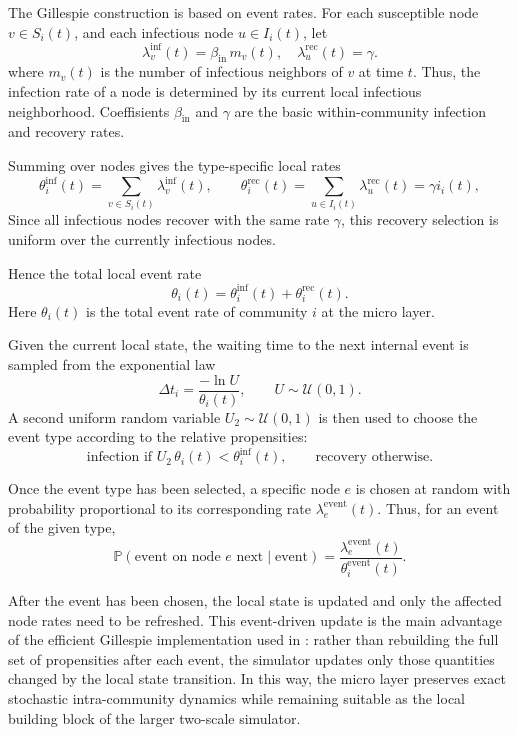 \documentclass{article}
\begin{document}
The Gillespie construction is based on event rates. For each susceptible node \(v\in S_i(t)\), and each infectious node \(u\in I_i(t)\), let
\[
\lambda^{\mathrm{inf}}_v(t)=\beta_{\mathrm{in}}\, m_v(t),
\quad
\lambda^{\mathrm{rec}}_u(t)=\gamma.
\]
where \(m_v(t)\) is the number of infectious neighbors of \(v\) at time \(t\). Thus, the infection rate of a node is determined by its current local infectious neighborhood. Coeffisients \(\beta_{\mathrm{in}}\) and \(\gamma\) are the basic within-community infection and recovery rates.

Summing over nodes gives the type-specific local rates
\[
\theta_i^{\mathrm{inf}}(t)=\sum_{v\in S_i(t)} \lambda^{\mathrm{inf}}_v(t),
\qquad
\theta_i^{\mathrm{rec}}(t)=\sum_{u\in I_i(t)} \lambda^{\mathrm{rec}}_u(t)=\gamma i_i(t),
\]
Since all infectious nodes recover with the same rate \(\gamma\), this recovery selection is uniform over the currently infectious nodes. 

Hence the total local event rate
\[
\theta_i(t)=\theta_i^{\mathrm{inf}}(t)+\theta_i^{\mathrm{rec}}(t).
\]
Here \(\theta_i(t)\) is the total event rate of community \(i\) at the micro layer.

Given the current local state, the waiting time to the next internal event is sampled from the exponential law
\[
\Delta t_i=\frac{-\ln U}{\theta_i(t)},
\qquad U\sim\mathcal U(0,1).
\]
A second uniform random variable \(U_2\sim\mathcal U(0,1)\) is then used to choose the event type according to the relative propensities:
\[
\text{infection if } U_2\,\theta_i(t) < \theta_i^{\mathrm{inf}}(t),
\qquad
\text{recovery otherwise.}
\]

Once the event type has been selected, a specific node $e$ is chosen at random with probability proportional to its corresponding rate \(\lambda^{\mathrm{event}}_e(t)\). Thus, for an event of the given type,
\[
\mathbb P(\text{event on node } e \text{ next}\mid \mathrm{event})=
\frac{\lambda^{\mathrm{event}}_e(t)}{\theta_i^{\mathrm{event}}(t)}.
\]

After the event has been chosen, the local state is updated and only the affected node rates need to be refreshed. This event-driven update is the main advantage of the efficient Gillespie implementation used in \cite{kuryliak2025simulating}: rather than rebuilding the full set of propensities after each event, the simulator updates only those quantities changed by the local state transition. In this way, the micro layer preserves exact stochastic intra-community dynamics while remaining suitable as the local building block of the larger two-scale simulator.
\end{document}
